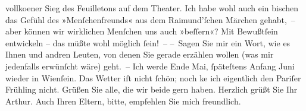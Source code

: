 \begin{ledgroupsized}[t]{13cm}
                    vollko{\geminationm}ener Sieg des Feuilletons auf dem Theater. Ich habe {\pb}wohl auch ein bischen das Gefühl des »Menſchenfreunds« aus dem Raimund’ſchen Märchen gehabt, – aber können
                    wir wirklichen Menſchen uns auch »beſſern«? Mit Bewußtſein entwickeln – das müßte
                    wohl möglich ſein! –\pend
           \pstart
           – Sagen Sie mir ein Wort, wie es Ihnen und andren Leuten, von denen Sie gerade
                    erzählen wollen (was mir jedenfalls erwünſcht wäre) geht. – Ich werde Ende
                        Mai, ſpäteſtens Anfang Juni wieder in Wienſein. Das Wetter iſt nicht ſchön; noch ke{\geminationn} ich eigentlich den Pariſer Frühling nicht.\pend
           \pstart
           Grüßen Sie alle, die wir beide gern haben.\pend
           \pstart Herzlich grüßt Sie Ihr \spacefill\mbox{Arthur.}\pend{}\pstart
           \noindent{}Auch Ihren Eltern, bitte, empfehlen Sie mich freundlich.\pend
           
         
         \endnumbering{}\end{ledgroupsized}  \newcommand{\dateiname}{L00671}\newcommand{\titel}{Arthur Schnitzler an Hugo von Hofmannsthal, 26. 4. 1897}\newcommand{\editorInnen}{Martin Anton Müller und Gerd-Hermann Susen}
      
